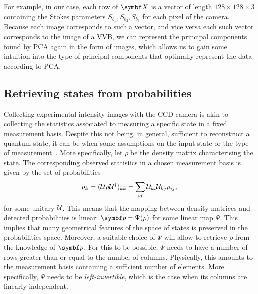 For example, in our case, each row of $\bs X$ is a vector of length $128\times128\times3$ containing the Stokes parameters $S_{b_1}, S_{b_2}, S_{b_3}$ for each pixel of the camera.
Because each image corresponds to such a vector, and vice versa each such vector corresponds to the image of a \ac{VVB}, we can represent the principal components found by \ac{PCA} again in the form of images, which allows us to gain some intuition into the type of principal components that optimally represent the data according to \ac{PCA}.


\subsection{Retrieving states from probabilities}

Collecting experimental intensity images with the \ac{CCD} camera is akin to collecting the statistics associated to measuring a specific state in a fixed measurement basis. Despite this not being, in general, sufficient to reconstruct a quantum state, it can be when some assumptions on the input state or the type of measurement~\cite{banchi2018multiphoton}.
More specifically, let $\rho$ be the density matrix characterising the state. The corresponding observed statistics in a chosen measurement basis is given by the set of probabilities
\begin{equation}
	p_k = ({\mathcal{U}}\rho{\mathcal{U}}^\dagger)_{kk}
	    = \sum_{ij}{\mathcal{U}}_{ki}\bar{{\mathcal{U}}}_{kj}\rho_{ij},
\end{equation}
for some unitary ${\mathcal{U}}$.
This means that the mapping between density matrices and detected probabilities is linear: $\bs p=\Psi(\rho)$ for some linear map $\Psi$. This implies that many geometrical features of the space of states is preserved in the probabilities space. Moreover, a suitable choice of $\Psi$ will allow to retrieve $\rho$ from the knowledge of $\bs p$.
For this to be possible, $\Psi$ needs to have a number of rows greater than or equal to the number of columns. Physically, this amounts to the measurement basis containing a sufficient number of elements. More specifically, $\Psi$ needs to be \emph{left-invertible}, which is the case when its columns are linearly independent.


